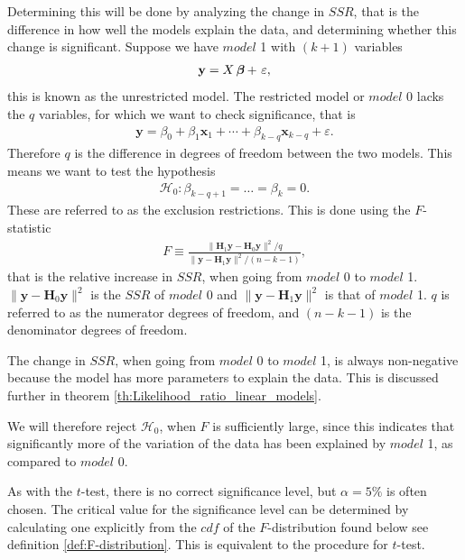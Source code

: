Determining this will be done by analyzing the change in $SSR$, that is the difference in how well the models explain the data, and determining whether this change is significant. 
Suppose we have $model$ 1 with $(k+1)$ variables 
\begin{align*}
    \textbf{y} = X \operatorname{\boldsymbol{\beta}} +\  \varepsilon,
\end{align*}
this is known as the unrestricted model. The restricted model or $model$ 0 lacks the $q$ variables, for which we want to check significance, that is
\begin{align*}
    \textbf{y} = \beta_0 + \beta_1 \textbf{x}_1 + \cdots + \beta_{k-q} \textbf{x}_{k-q} + \varepsilon.
\end{align*}
Therefore $q$ is the difference in degrees of freedom between the two models.
This means we want to test the hypothesis
\begin{align}
    \mathcal{H}_0: \beta_{k-q+1} = \ldots = \beta_k = 0.
\end{align}
These are referred to as the exclusion restrictions. 
This is done using the $F$-statistic
\begin{align}\label{eq:F_statistic}
    F \equiv \frac{\| \textbf{H}_1 \textbf{y} - \textbf{H}_0 \textbf{y} \|^2/q}{\| \textbf{y} - \textbf{H}_1 \textbf{y} \|^2/(n-k-1)},
\end{align}
that is the relative increase in $SSR$, when going from $model$ 0 to $model$ 1. 
$\| \textbf{y} - \textbf{H}_0 \textbf{y} \|^2$ is the $SSR$ of $model$ 0 and $\| \textbf{y} - \textbf{H}_1 \textbf{y} \|^2$ is that of $model$ 1. 
$q$ is referred to as the numerator degrees of freedom, and $(n-k-1)$ is the denominator degrees of freedom. 

The change in $SSR$, when going from $model$ 0 to $model$ 1, is always non-negative because the model has more parameters to explain the data. 
This is discussed further in theorem \ref{th:Likelihood_ratio_linear_models}.

We will therefore reject $\mathcal{H}_0$, when $F$ is sufficiently large, since this indicates that significantly more of the variation of the data has been explained by $model$ 1, as compared to $model$ 0.

As with the $t$-test, there is no correct significance level, but $\alpha = 5 \%$ is often chosen. 
The critical value for the significance level can be determined by calculating one explicitly from the $cdf$ of the $F$-distribution found below see definition \ref{def:F-distribution}. 
This is equivalent to the procedure for $t$-test.

